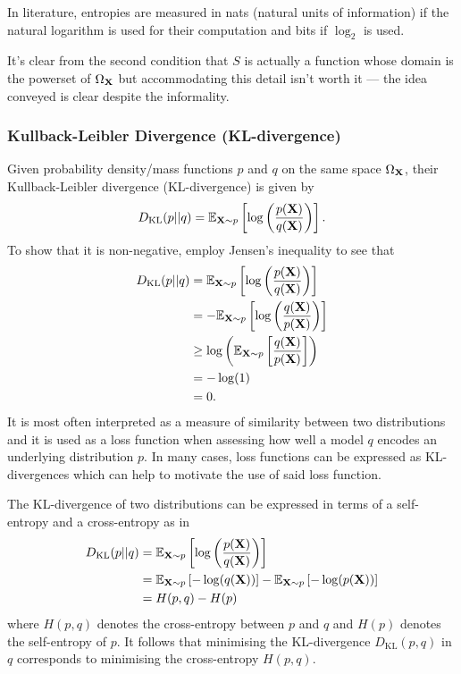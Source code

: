 \documentclass[11pt]{article}
\begin{document}
\begin{appendices}
In literature, entropies are measured in nats (natural units of information) if the natural logarithm is used for their computation and bits if $\log_2$ is used.

\begin{tcolorbox}[title={\centering\textbf{Technical note regarding} $\text{dom}(S)$}, colback=myLightBlue, colbacktitle=myDarkBlue, colframe=myDarkBlue, coltitle=white]
    It's clear from the second condition that $S$ is actually a function whose domain is the powerset of $\Omega_{\mathbf{X}}$ but accommodating this detail isn't worth it — the idea conveyed is clear despite the informality.
\end{tcolorbox}

\subsubsection{Kullback-Leibler Divergence (KL-divergence)}

Given probability density/mass functions $p$ and $q$ on the same space $\Omega_{\mathbf{X}}$, their Kullback-Leibler divergence (KL-divergence) is given by
$$
D_{\text{KL}}(p||q)
=
\mathbb{E}_{\mathbf{X}\sim p}\left[\log\left(\frac{p(\mathbf{X})}{q(\mathbf{X})}\right)\right].
$$
To show that it is non-negative, employ Jensen's inequality to see that
\begin{align*}
    D_{\text{KL}}(p||q)
    &=
    \mathbb{E}_{\mathbf{X}\sim p}\left[\log\left(\frac{p(\mathbf{X})}{q(\mathbf{X})}\right)\right]\\
    &=
    -\mathbb{E}_{\mathbf{X}\sim p}\left[\log\left(\frac{q(\mathbf{X})}{p(\mathbf{X})}\right)\right]\\
    &\geq
    \log\left(\mathbb{E}_{\mathbf{X}\sim p}\left[\frac{q(\mathbf{X})}{p(\mathbf{X})}\right]\right)\\
    &=
    -\log(1)\\
    &=0.
\end{align*}
It is most often interpreted as a measure of similarity between two distributions and it is used as a loss function when assessing how well a model $q$ encodes an underlying distribution $p$. In many cases, loss functions can be expressed as KL-divergences which can help to motivate the use of said loss function.

The KL-divergence of two distributions can be expressed in terms of a self-entropy and a cross-entropy as in
\begin{align*}
    D_{\text{KL}}(p||q)
    &=
    \mathbb{E}_{\mathbf{X}\sim p}\left[\log\left(\frac{p(\mathbf{X})}{q(\mathbf{X})}\right)\right]\\
    &=
    \mathbb{E}_{\mathbf{X}\sim p}\left[-\log(q(\mathbf{X}))\right]-\mathbb{E}_{\mathbf{X}\sim p}\left[-\log(p(\mathbf{X}))\right]\\
    &=
    H(p,q)-H(p)
\end{align*}
where $H(p,q)$ denotes the cross-entropy between $p$ and $q$ and $H(p)$ denotes the self-entropy of $p$. It follows that minimising the KL-divergence $D_{\text{KL}}(p,q)$ in $q$ corresponds to minimising the cross-entropy $H(p,q)$.


\end{appendices}
\end{document}
